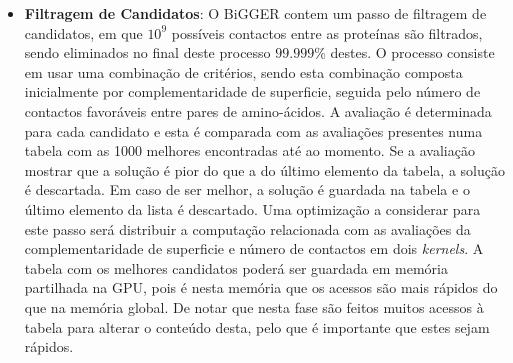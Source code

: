 \begin{itemize}
\item{\textbf{Filtragem de Candidatos}}: O BiGGER contem um passo de filtragem de candidatos, em que $10^{9}$ possíveis contactos entre as proteínas são filtrados, sendo eliminados no final deste processo $99.999\%$ destes. O processo consiste em usar uma combinação de critérios, sendo esta combinação composta inicialmente por complementaridade de superficie, seguida pelo número de contactos favoráveis entre pares de amino-ácidos. A avaliação é determinada para cada candidato e esta é comparada com as avaliações presentes numa tabela com as 1000 melhores encontradas até ao momento. Se a avaliação mostrar que a solução é pior do que a do último elemento da tabela, a solução é descartada. Em caso de ser melhor, a solução é guardada na tabela e o último elemento da lista é descartado. Uma optimização a considerar para este passo será distribuir a computação relacionada com as avaliações da complementaridade de superficie e número de contactos em dois \textit{kernels}. A tabela com os melhores candidatos poderá ser guardada em memória partilhada na GPU, pois é nesta memória que os acessos são mais rápidos do que na memória global. De notar que nesta fase são feitos muitos acessos à tabela para alterar o conteúdo desta, pelo que é importante que estes sejam rápidos.

\end{itemize}
